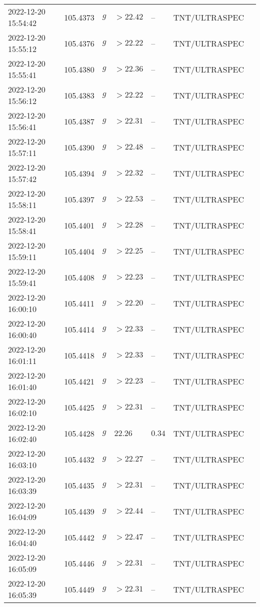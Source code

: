 \documentclass{nature_plusfigure}
\begin{document}
\begin{supplement}
\begin{center}
\begin{longtable}{lllllll}
2022-12-20 15:54:42 & 105.4373 & $g$ & $>22.42$ & -- & TNT/ULTRASPEC &  \\ 
2022-12-20 15:55:12 & 105.4376 & $g$ & $>22.22$ & -- & TNT/ULTRASPEC &  \\ 
2022-12-20 15:55:41 & 105.4380 & $g$ & $>22.36$ & -- & TNT/ULTRASPEC &  \\ 
2022-12-20 15:56:12 & 105.4383 & $g$ & $>22.22$ & -- & TNT/ULTRASPEC &  \\ 
2022-12-20 15:56:41 & 105.4387 & $g$ & $>22.31$ & -- & TNT/ULTRASPEC &  \\ 
2022-12-20 15:57:11 & 105.4390 & $g$ & $>22.48$ & -- & TNT/ULTRASPEC &  \\ 
2022-12-20 15:57:42 & 105.4394 & $g$ & $>22.32$ & -- & TNT/ULTRASPEC &  \\ 
2022-12-20 15:58:11 & 105.4397 & $g$ & $>22.53$ & -- & TNT/ULTRASPEC &  \\ 
2022-12-20 15:58:41 & 105.4401 & $g$ & $>22.28$ & -- & TNT/ULTRASPEC &  \\ 
2022-12-20 15:59:11 & 105.4404 & $g$ & $>22.25$ & -- & TNT/ULTRASPEC &  \\ 
2022-12-20 15:59:41 & 105.4408 & $g$ & $>22.23$ & -- & TNT/ULTRASPEC &  \\ 
2022-12-20 16:00:10 & 105.4411 & $g$ & $>22.20$ & -- & TNT/ULTRASPEC &  \\ 
2022-12-20 16:00:40 & 105.4414 & $g$ & $>22.33$ & -- & TNT/ULTRASPEC &  \\ 
2022-12-20 16:01:11 & 105.4418 & $g$ & $>22.33$ & -- & TNT/ULTRASPEC &  \\ 
2022-12-20 16:01:40 & 105.4421 & $g$ & $>22.23$ & -- & TNT/ULTRASPEC &  \\ 
2022-12-20 16:02:10 & 105.4425 & $g$ & $>22.31$ & -- & TNT/ULTRASPEC &  \\ 
2022-12-20 16:02:40 & 105.4428 & $g$ & $22.26$ & $0.34$ & TNT/ULTRASPEC &  \\ 
2022-12-20 16:03:10 & 105.4432 & $g$ & $>22.27$ & -- & TNT/ULTRASPEC &  \\ 
2022-12-20 16:03:39 & 105.4435 & $g$ & $>22.31$ & -- & TNT/ULTRASPEC &  \\ 
2022-12-20 16:04:09 & 105.4439 & $g$ & $>22.44$ & -- & TNT/ULTRASPEC &  \\ 
2022-12-20 16:04:40 & 105.4442 & $g$ & $>22.47$ & -- & TNT/ULTRASPEC &  \\ 
2022-12-20 16:05:09 & 105.4446 & $g$ & $>22.31$ & -- & TNT/ULTRASPEC &  \\ 
2022-12-20 16:05:39 & 105.4449 & $g$ & $>22.31$ & -- & TNT/ULTRASPEC &  \\ 

\end{longtable}
\end{center}
\end{supplement}
\end{document}
